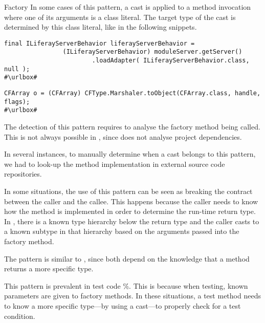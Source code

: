 \begin{pattern}{Factory}
In some cases of this pattern, a cast is applied to a method invocation where one of its arguments is a class literal.
The target type of the cast is determined by this class literal,
like in the following snippets.
\def\urlvar{http://bit.ly/liferay_liferay_ide_2FMG0f6}
\begin{verbatim}
final ILiferayServerBehavior liferayServerBehavior =
                (ILiferayServerBehavior) moduleServer.getServer()
                        .loadAdapter( ILiferayServerBehavior.class, null );
#\urlbox#
\end{verbatim}

\def\urlvar{http://bit.ly/robovm_robovm_2FMFWvS}
\begin{verbatim}
CFArray o = (CFArray) CFType.Marshaler.toObject(CFArray.class, handle, flags);
#\urlbox#
\end{verbatim} 


\detection{}
The detection of this pattern requires to analyse the factory method being called.
This is not always possible in \ql{},
since \ql{} does not analyse project dependencies.

In several instances, to manually determine when a cast belongs to this pattern,
we had to look-up the method implementation in external source code repositories.

\issues{}
In some situations,
the use of this pattern can be seen as breaking the contract between the caller and the callee.
This happens because the caller needs to know how the method is implemented in order to determine the run-time return type.
In \thisp{}, there is a known type hierarchy 
below the return type and the caller casts to a known subtype
in that hierarchy based on the arguments passed into the factory method.

The  pattern is similar to \thisp{},
since both depend on the knowledge that a method returns a more specific type.

This pattern is prevalent in test code \nFactoryPatternTestPerc{}\%.
This is because when testing,
known parameters are given to factory methods.
In these situations, a test method needs to know a more specific type---by using a cast---to properly check for a test condition. 

\end{pattern}

